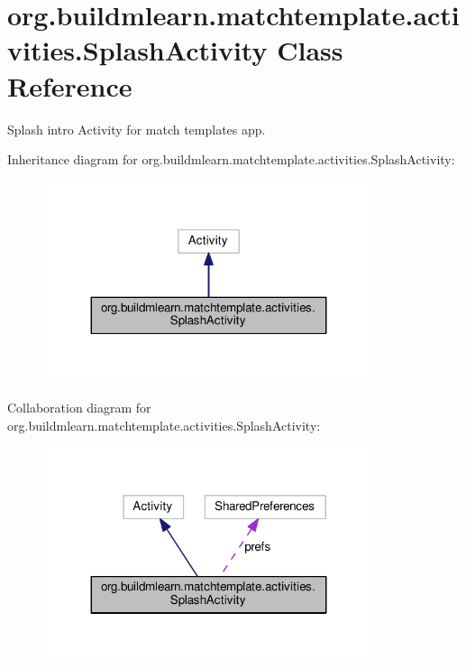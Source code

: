 \hypertarget{classorg_1_1buildmlearn_1_1matchtemplate_1_1activities_1_1SplashActivity}{}\section{org.\+buildmlearn.\+matchtemplate.\+activities.\+Splash\+Activity Class Reference}
\label{classorg_1_1buildmlearn_1_1matchtemplate_1_1activities_1_1SplashActivity}


Splash intro Activity for match template\textquotesingle{}s app.  




Inheritance diagram for org.\+buildmlearn.\+matchtemplate.\+activities.\+Splash\+Activity\+:
\nopagebreak
\begin{figure}[H]
\begin{center}
\leavevmode
\includegraphics[width=275pt]{classorg_1_1buildmlearn_1_1matchtemplate_1_1activities_1_1SplashActivity__inherit__graph}
\end{center}
\end{figure}


Collaboration diagram for org.\+buildmlearn.\+matchtemplate.\+activities.\+Splash\+Activity\+:
\nopagebreak
\begin{figure}[H]
\begin{center}
\leavevmode
\includegraphics[width=275pt]{classorg_1_1buildmlearn_1_1matchtemplate_1_1activities_1_1SplashActivity__coll__graph}
\end{center}
\end{figure}

